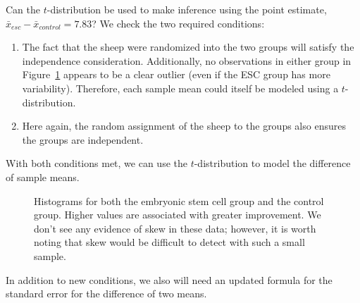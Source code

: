 \begin{examplewrap}
\begin{nexample}{Can the $t$-distribution be used to make
    inference using the point estimate,
    $\bar{x}_{esc} - \bar{x}_{control} = 7.83$?}
  We check the two required conditions:
  \begin{enumerate}
  \setlength{\itemsep}{0mm}
  \item
      The fact that the sheep were randomized into
      the two groups will satisfy the independence
      consideration.
      Additionally, no observations in either group
      in Figure~\ref{stemCellTherapyForHearts}
      appears to be a clear outlier
      (even if the ESC group has more variability).
      Therefore, each sample mean could itself
      be modeled using a $t$-distribution.
  \item
      Here again, the random assignment of the
      sheep to the groups also ensures the groups
      are independent.
  \end{enumerate}
  With both conditions met, we can use the
  $t$-distribution to model the difference of sample means.
\end{nexample}
\end{examplewrap}

\begin{figure}[h]
  \centering
  \caption{Histograms for both the embryonic stem cell group
      and the control group.
      Higher values are associated with greater improvement.
      We don't see any evidence of skew in these data;
      however, it is worth noting that skew would be difficult
      to detect with such a small sample.}
  \label{stemCellTherapyForHearts}
\end{figure}


In addition to new conditions, we also will need an updated
formula for the standard error for the difference of two means.

